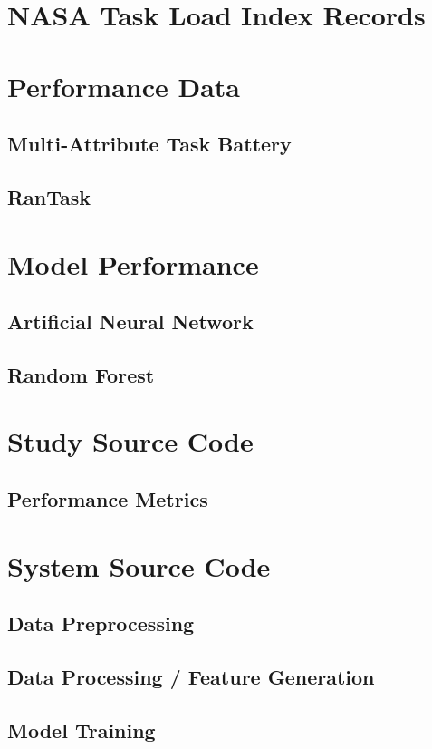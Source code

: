 \documentclass[11pt]{article}
\begin{document}
\pagebreak
\begin{appendices}
\appendixpage
\noappendicestocpagenum
\addappheadtotoc
\section{NASA Task Load Index Records}
\section{Performance Data}
	\subsection{Multi-Attribute Task Battery}
	\subsection{RanTask}
\section{Model Performance}
	\subsection{Artificial Neural Network}
	\subsection{Random Forest}
\section{Study Source Code}
	\subsection{Performance Metrics}
\section{System Source Code}
	\subsection{Data Preprocessing}
	\subsection{Data Processing / Feature Generation}
	\subsection{Model Training}
\end{appendices}	
\end{document}
